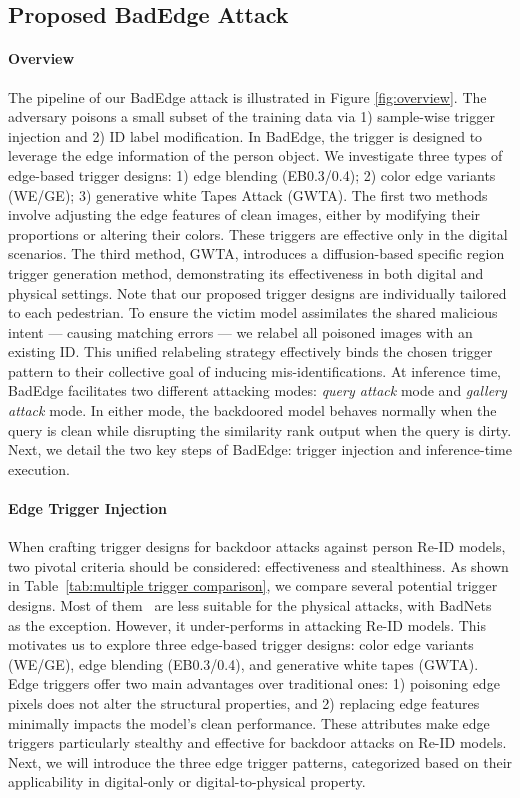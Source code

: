 \documentclass[sigconf,authordraft]{acmart}
\begin{document}


\subsection{Proposed BadEdge Attack}\label{sec:proposed attacks}
\paragraph{Overview}
The pipeline of our BadEdge attack is illustrated in Figure \ref{fig:overview}. The adversary poisons a small subset of the training data via 1) sample-wise trigger injection and 2) ID label modification.
In BadEdge, the trigger is designed to leverage the edge information of the person object. We investigate three types of edge-based trigger designs: 1) edge blending (EB0.3/0.4); 2) color edge variants (WE/GE); 3) generative white Tapes Attack (GWTA). 
The first two methods involve adjusting the edge features of clean images, either by modifying their proportions or altering their colors. These triggers are effective only in the digital scenarios. The third method, GWTA, introduces a diffusion-based specific region trigger generation method, demonstrating its effectiveness in both digital and physical settings.
Note that our proposed trigger designs are individually tailored to each pedestrian. To ensure the victim model assimilates the shared malicious intent — causing matching errors — we relabel all poisoned images with an existing ID. This unified relabeling strategy effectively binds the chosen trigger pattern to their collective goal of inducing mis-identifications.
At inference time, BadEdge facilitates two different attacking modes: \emph{query attack} mode and \emph{gallery attack} mode. In either mode, the backdoored model behaves normally when the query is clean while disrupting the similarity rank output when the query is dirty.
Next, we detail the two key steps of BadEdge: trigger injection and inference-time execution.

\paragraph{Edge Trigger Injection}
When crafting trigger designs for backdoor attacks against person Re-ID models, two pivotal criteria should be considered: effectiveness and stealthiness. As shown in Table~\ref{tab:multiple trigger comparison}, we compare several potential trigger designs. Most of them~\cite{chen2017targeted,liu2020reflection,barni2019new,nguyen2021wanet} are less suitable for the physical attacks, with BadNets~\cite{Gu2017BadNetsIV} as the exception. However, it under-performs in attacking Re-ID models. This motivates us to explore three edge-based trigger designs: color edge variants (WE/GE), edge blending (EB0.3/0.4), and generative white tapes (GWTA). Edge triggers offer two main advantages over traditional ones: 1) poisoning edge pixels does not alter the structural properties, and 2) replacing edge features minimally impacts the model's clean performance. 
These attributes make edge triggers particularly stealthy and effective for backdoor attacks on Re-ID models. Next, we will introduce the three edge trigger patterns, categorized based on their applicability in digital-only or digital-to-physical property.
\end{document}
